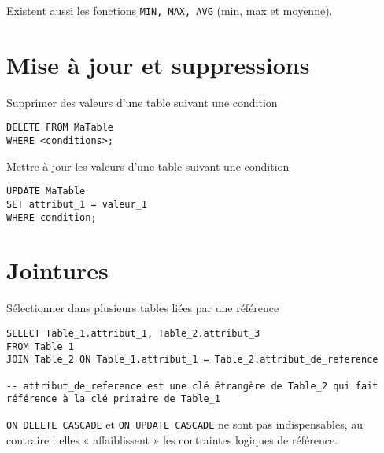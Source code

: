 \documentclass[a4paper,10pt,article]{nsi}
\begin{document}
Existent aussi les fonctions \texttt{MIN, MAX, AVG} (min, max et moyenne).

\section*{Mise à jour et suppressions}

Supprimer des valeurs d'une table suivant une condition

\begin{sql}
    \begin{verbatim}
DELETE FROM MaTable
WHERE <conditions>;
\end{verbatim}
\end{sql}

Mettre à jour les valeurs d'une table suivant une condition
\begin{sql}
    \begin{verbatim}
UPDATE MaTable
SET attribut_1 = valeur_1
WHERE condition;
\end{verbatim}
\end{sql}

\section*{Jointures}

Sélectionner dans plusieurs tables liées par une référence
\begin{sql}
    \begin{verbatim}
SELECT Table_1.attribut_1, Table_2.attribut_3
FROM Table_1
JOIN Table_2 ON Table_1.attribut_1 = Table_2.attribut_de_reference

-- attribut_de_reference est une clé étrangère de Table_2 qui fait référence à la clé primaire de Table_1
\end{verbatim}
\end{sql}

\texttt{ON DELETE CASCADE} et \texttt{ON UPDATE CASCADE} ne sont pas indispensables, au contraire : elles « affaiblissent » les contraintes logiques de référence.
\end{document}
